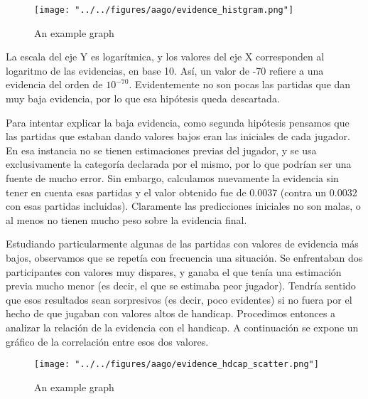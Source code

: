 \documentclass[a4paper,10pt]{report}
\begin{document}
\begin{figure}
	\centering
	\texttt{[image: "../../figures/aago/evidence\_histgram.png"]}
	\caption{An example graph}
	\label{fig:aago-hist}
\end{figure}

La escala del eje Y es logarítmica, y los valores del eje X corresponden al logaritmo de las evidencias, en base 10. Así, un valor de -70 refiere a una evidencia del orden de $10^{-70}$.
Evidentemente no son pocas las partidas que dan muy baja evidencia, por lo que esa hipótesis queda descartada.

Para intentar explicar la baja evidencia, como segunda hipótesis pensamos que las partidas que estaban dando valores bajos eran las iniciales de cada jugador.
En esa instancia no se tienen estimaciones previas del jugador, y se usa exclusivamente la categoría declarada por el mismo, por lo que podrían ser una fuente de mucho error.
Sin embargo, calculamos nuevamente la evidencia sin tener en cuenta esas partidas y el valor obtenido fue de 0.0037 (contra un 0.0032 con esas partidas incluidas).
Claramente las predicciones iniciales no son malas, o al menos no tienen mucho peso sobre la evidencia final.

Estudiando particularmente algunas de las partidas con valores de evidencia más bajos, observamos que se repetía con frecuencia una situación.
Se enfrentaban dos participantes con valores muy dispares, y ganaba el que tenía una estimación previa mucho menor (es decir, el que se estimaba peor jugador).
Tendría sentido que esos resultados sean sorpresivos (es decir, poco evidentes) si no fuera por el hecho de que jugaban con valores altos de handicap.
Procedimos entonces a analizar la relación de la evidencia con el handicap.
A continuación se expone un gráfico de la correlación entre esos dos valores.

\begin{figure}
	\centering
	\texttt{[image: "../../figures/aago/evidence\_hdcap\_scatter.png"]}
	\caption{An example graph}
	\label{fig:aago-hdcap}
\end{figure}
\end{document}
